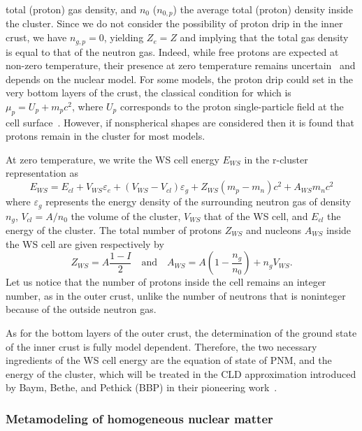 total (proton) gas density, and $n_0$ ($n_{0,p}$) the average total (proton) 
density inside the cluster. Since we do not consider the possibility of proton 
drip in the inner crust, we have $n_{g,p} = 0$, yielding $Z_e = Z$ and implying
that the total gas density is equal to that of the neutron gas. Indeed, 
while free protons are expected at non-zero temperature, their presence at zero 
temperature remains uncertain~\cite{BBP} and depends on the nuclear model. For 
some models, the proton drip could set in the very bottom layers of the crust, 
the classical condition for which is $\mu_p = U_p + m_pc^2$, where $U_p$ 
corresponds to the proton single-particle field at the cell 
surface~\cite{Pearson2018}. However, if nonspherical shapes are considered 
then it is found that protons remain in the cluster for most models.

At zero temperature, we write the WS cell energy $E_{WS}$ in the r-cluster 
representation as
%
\begin{equation}
  E_{WS} = E_{cl} + V_{WS}\varepsilon_e +
  (V_{WS}-V_{cl})\varepsilon_g + Z_{WS}(m_p - m_n)c^2 + A_{WS}m_nc^2\label{eq:ews_icrust}
\end{equation}
%
where $\varepsilon_g$ represents the energy density of the surrounding neutron gas
of density $n_g$, $V_{cl}=A/n_0$ the volume of the cluster, $V_{WS}$ that of
the WS cell, and $E_{cl}$ the energy of the cluster. The total number of
protons $Z_{WS}$ and nucleons $A_{WS}$ inside the WS cell are given respectively by
%
\begin{equation}
  Z_{WS} = A\frac{1-I}{2} \quad \text{and} \quad A_{WS} =
  A\left(1-\frac{n_g}{n_0}\right) + n_gV_{WS}.
\end{equation}
%
Let us notice that the number of protons inside the cell remains an
integer number, as in the outer crust, unlike the number of neutrons that is
noninteger because of the outside neutron gas.

As for the bottom layers of the outer crust, the determination of the ground 
state of the inner crust is fully model dependent.
Therefore, the two necessary ingredients of the WS cell energy are the 
equation of state of PNM, and the energy of the cluster, 
which will be treated in the CLD approximation 
introduced by Baym, Bethe, and Pethick (BBP) in their pioneering work~\cite{BBP}.

\subsubsection{Metamodeling of homogeneous nuclear matter}\label{subsubsec:hnm}

